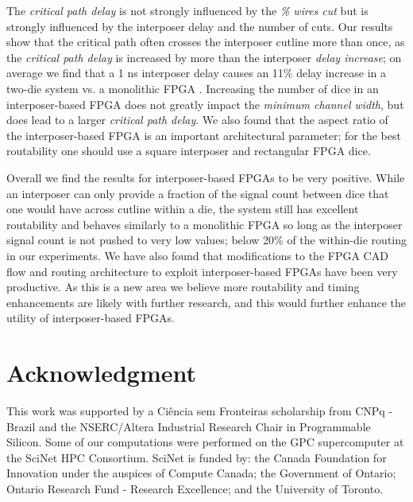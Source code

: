 \documentclass[journal]{IEEEtran}
\begin{document}
The \textit{critical path delay} is not strongly influenced by the \textit{\% wires cut} but is strongly influenced by the interposer delay and the number of cuts. Our results show that the critical path often crosses the interposer cutline more than once, as the \textit{critical path delay} is increased by more than the interposer \textit{delay increase}; on average we find that a 1 ns interposer delay causes an 11\% delay increase in a two-die system vs. a monolithic FPGA . Increasing the number of dice in an interposer-based FPGA does not greatly impact the \textit{minimum channel width}, but does lead to a larger \textit{critical path delay}. We also found that the aspect ratio of the interposer-based FPGA is an important architectural parameter; for the best routability one should use a square interposer and rectangular FPGA dice.

Overall we find the results for interposer-based FPGAs to be very positive. While an interposer can only provide a fraction of the signal count between dice that one would have across cutline within a die, the system still has excellent routability and behaves similarly to a monolithic FPGA so long as the interposer signal count is not pushed to very low values; below 20\% of the within-die routing in our experiments. We have also found that modifications to the FPGA CAD flow and routing architecture to exploit interposer-based FPGAs have been very productive. As this is a new area we believe more routability and timing enhancements are likely with further research, and this would further enhance the utility of interposer-based FPGAs.

\section*{Acknowledgment}
This work was supported by a Ci\^{e}ncia sem Fronteiras scholarship from CNPq - Brazil and the NSERC/Altera Industrial Research Chair in Programmable Silicon. Some of our computations were performed on the GPC supercomputer at the SciNet HPC Consortium. SciNet is funded by: the Canada Foundation for Innovation under the auspices of Compute Canada; the Government of Ontario; Ontario Research Fund - Research Excellence; and the University of Toronto.




\end{document}
